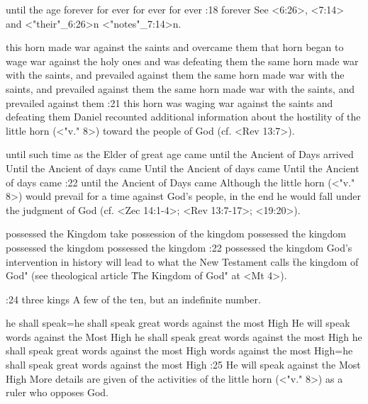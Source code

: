     {until the age} %
    {forever} %
    {for ever} %
    {for ever} %
    {for ever} %
:18 {forever} See <6:26>, <7:14>  and <"their"_6:26>n <"notes"_7:14>n.

    {this horn made war against the saints and overcame them} %
    {that horn began to wage war against the holy ones and was defeating them} %
    {the same horn made war with the saints, and prevailed against them} %
    {the same horn made war with the saints, and prevailed against them} %
    {the same horn made war with the saints, and prevailed against them} %
:21 {this horn was waging war against the saints and defeating them} Daniel recounted additional
information about the hostility of the little horn (<"v." 8>) toward the people of God (cf. <Rev 13:7>).

    {until such time as the Elder of great age came} %
    {until the Ancient of Days arrived} %
    {Until the Ancient of days came} %
    {Until the Ancient of days came} %
    {Until the Ancient of days came} %
:22 {until the Ancient of Days came} Although the little horn 
(<"v." 8>) would prevail for a time against God's people, in the end he 
would fall under the judgment of God (cf. <Zec 14:1-4>; <Rev 13:7-17>; 
<19:20>).


    {possessed the Kingdom} %
    {take possession of the kingdom} %
    {possessed the kingdom} %
    {possessed the kingdom} %
    {possessed the kingdom} %
:22 {possessed the kingdom} God's intervention in history will 
lead to what the New Testament calls \"the kingdom of God" (see 
theological article \"The Kingdom of God" at <Mt 4>).

:24 {three kings} A few of the ten, but an indefinite number.

    {he shall speak}={he shall speak great words against the most High} %
    {He will speak words against the Most High} %
    {he shall speak great words against the most High} %
    {he shall speak great words against the most High} %
    {words against the most High}={he shall speak great words against the most High} %
:25 {He will speak against the Most High} More details are given of the activities of the little
horn (<"v." 8>) as a ruler who opposes   God.


